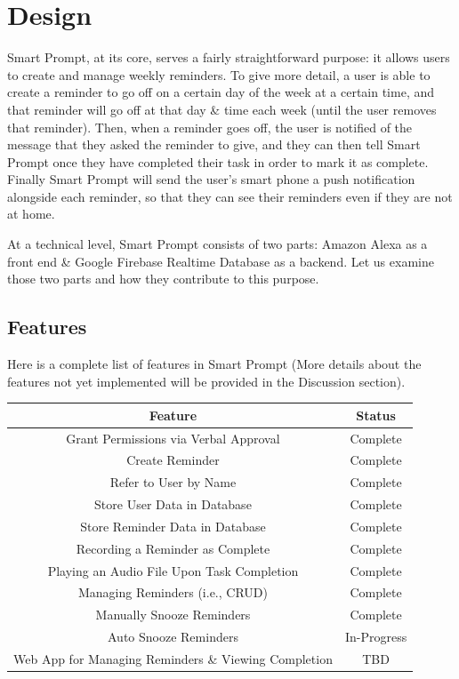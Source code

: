 \documentclass[11pt, oneside]{article}
\begin{document}
\section{Design}

Smart Prompt, at its core, serves a fairly straightforward purpose: it allows users to create and manage weekly reminders. 
To give more detail, a user is able to create a reminder to go off on a certain day of the week at a certain time, and that reminder will go off at that day \& time each week (until the user removes that reminder). 
Then, when a reminder goes off, the user is notified of the message that they asked the reminder to give, and they can then tell Smart Prompt once they have completed their task in order to mark it as complete. 
Finally Smart Prompt will send the user's smart phone a push notification alongside each reminder, so that they can see their reminders even if they are not at home. 

At a technical level, Smart Prompt consists of two parts: Amazon Alexa as a front end \& Google Firebase Realtime Database as a backend. 
Let us examine those two parts and how they contribute to this purpose. 

\subsection{Features}

Here is a complete list of features in Smart Prompt (More details about the features not yet implemented will be provided in the Discussion section).
\begin{center}
\begin{tabular}{| c | c |}
 \hline
 Feature & Status \\ [0.5ex] 
 \hline\hline
 Grant Permissions via Verbal Approval & Complete \\
 \hline
 Create Reminder & Complete \\
 \hline
 Refer to User by Name & Complete \\
 \hline
 Store User Data in Database & Complete \\
 \hline
 Store Reminder Data in Database & Complete \\
 \hline
 Recording a Reminder as Complete & Complete \\
 \hline
 Playing an Audio File Upon Task Completion & Complete \\
 \hline
 Managing Reminders (i.e., CRUD) & Complete \\
 \hline
 Manually Snooze Reminders & Complete \\
 \hline
 Auto Snooze Reminders & In-Progress \\
 \hline
 Web App for Managing Reminders \& Viewing Completion & TBD \\
 \hline
\end{tabular}
\end{center}
\end{document}
